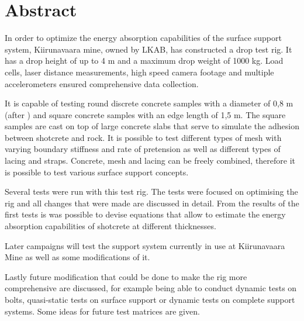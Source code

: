 \chapter*{Abstract}


In order to optimize the energy absorption capabilities of the surface support system, Kiirunavaara mine, owned by LKAB, has constructed a drop test rig. It has a drop height of up to 4 m and a maximum drop weight of 1000 kg. Load cells, laser distance measurements, high speed camera footage and multiple accelerometers ensured comprehensive data collection.

It is capable of testing round discrete concrete samples with a diameter of 0,8 m (after \textcite{c1550}) and square concrete samples with an edge length of 1,5 m. The square samples are cast on top of large concrete slabs that serve to simulate the adhesion between shotcrete and rock. It is possible to test different types of mesh with varying boundary stiffness and rate of pretension as well as different types of lacing and straps. Concrete, mesh and lacing can be freely combined, therefore it is possible to test various surface support concepts. 

Several tests were run with this test rig. The tests were focused on optimising the rig and all changes that were made are discussed in detail. From the results of the first tests is was possible to devise equations that allow to estimate the energy absorption capabilities of shotcrete at different thicknesses.

Later campaigns will test the support system currently in use at Kiirunavaara Mine as well as some modifications of it.

Lastly future modification that could be done to make the rig more comprehensive are discussed, for example being able to conduct dynamic tests on bolts, quasi-static tests on surface support or dynamic tests on complete support systems. %
Some ideas for future test matrices are given.

